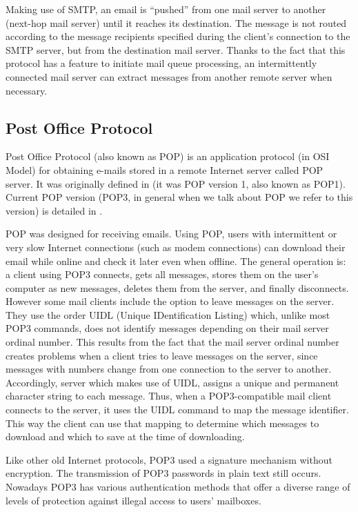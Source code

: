 Making use of SMTP, an email is ``pushed'' from one mail server to another (next-hop mail server) until it reaches its destination. The message is not routed according to the message recipients specified during the client's connection to the SMTP server, but from the destination mail server. Thanks to the fact that this protocol has a feature to initiate mail queue processing, an intermittently connected mail server can extract messages from another remote server when necessary.

\subsection{Post Office Protocol} \label{ssect:pop}

Post Office Protocol (also known as POP) is an application protocol (in OSI Model) for obtaining e-mails stored in a remote Internet server called POP server. It was originally defined in \cite{rfc918} (it was POP version 1, also known as POP1). Current POP version (POP3, in general when we talk about POP we refer to this version) is detailed in \cite{rfc1939}.

POP was designed for receiving emails. Using POP, users with intermittent or very slow Internet connections (such as modem connections) can download their email while online and check it later even when offline. The general operation is: a client using POP3 connects, gets all messages, stores them on the user's computer as new messages, deletes them from the server, and finally disconnects. However some mail clients include the option to leave messages on the server. They use the order UIDL (Unique IDentification Listing) which, unlike most POP3 commands, does not identify messages depending on their mail server ordinal number. This results from the fact that the mail server ordinal number creates problems when a client tries to leave messages on the server, since messages with numbers change from one connection to the server to another. Accordingly, server which makes use of UIDL, assigns a unique and permanent character string to each message. Thus, when a POP3-compatible mail client connects to the server, it uses the UIDL command to map the message identifier. This way the client can use that mapping to determine which messages to download and which to save at the time of downloading.

Like other old Internet protocols, POP3 used a signature mechanism without encryption. The transmission of POP3 passwords in plain text still occurs. Nowadays POP3 has various authentication methods that offer a diverse range of levels of protection against illegal access to users' mailboxes.

